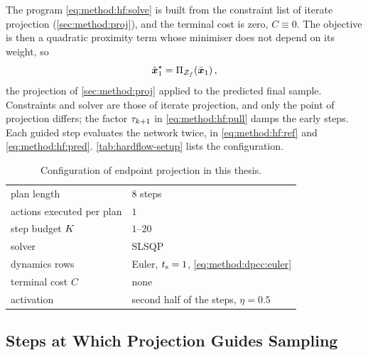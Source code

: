 The program \eqref{eq:method:hf:solve} is built from the constraint list of iterate projection
(\autoref{sec:method:proj}), and the terminal cost is zero, $C\equiv 0$. The objective is then a
quadratic proximity term whose minimiser does not depend on its weight, so
\begin{equation}\label{eq:method:hf:ours}
  \hat{\boldsymbol{x}}_{1}^{\star} = \Pi_{\mathcal{Z}_{f}}\!\left(\bar{\boldsymbol{x}}_{1}\right),
\end{equation}
the projection of \autoref{sec:method:proj} applied to the predicted final sample. Constraints and
solver are those of iterate projection, and only the point of projection differs; the factor
$\tau_{k+1}$ in \eqref{eq:method:hf:pull} damps the early steps. Each guided step evaluates the
network twice, in \eqref{eq:method:hf:ref} and \eqref{eq:method:hf:pred}.
\autoref{tab:hardflow-setup} lists the configuration.

\begin{table}[htpb]
  \caption[Configuration of endpoint projection]{Configuration of endpoint projection in this thesis.}
  \label{tab:hardflow-setup}
  \centering
  \begin{tabular}{ll}
    \toprule
    plan length               & $8$ steps \\
    actions executed per plan & $1$ \\
    step budget $K$        & $1$--$20$ \\
    solver                    & SLSQP \parencite{kraft1988software} \\
    dynamics rows             & Euler, $t_{\textrm{s}}=1$, \eqref{eq:method:dpcc:euler} \\
    terminal cost $C$         & none \\
    activation                & second half of the steps, $\eta = 0.5$ \\
    \bottomrule
  \end{tabular}
\end{table}

\subsection{Steps at Which Projection Guides Sampling}\label{sec:method:degenerate}

